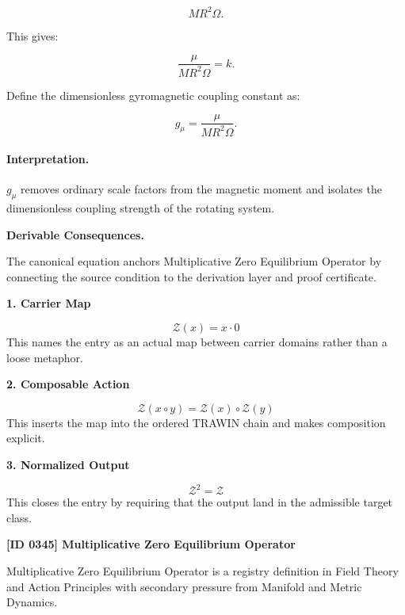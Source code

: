 \begin{equation}
MR^2\Omega .
\end{equation}

This gives:

\begin{equation}
\frac{\mu}{MR^2\Omega}=k .
\end{equation}

Define the dimensionless gyromagnetic coupling constant as:

\begin{equation}
\boxed{
g_{\mu}
=
\frac{\mu}
{MR^2\Omega}.
}
\end{equation}

\paragraph{Interpretation.}
$g_{\mu}$ removes ordinary scale factors from the magnetic moment and isolates the dimensionless coupling strength of the rotating system.

\par\vspace{0.35em}
\noindent\textbf{Derivable Consequences.}\quad
\begingroup
\footnotesize
\raggedright
The canonical equation anchors Multiplicative Zero Equilibrium Operator by connecting the source condition to the derivation layer and proof certificate.
\par\endgroup

\noindent\textbf{1. Carrier Map}\par
\[
\mathcal{Z}(x)=x\cdot0
\]
\noindent This names the entry as an actual map between carrier domains rather than a loose metaphor.\par
\noindent\textbf{2. Composable Action}\par
\[
\mathcal{Z}(x\circ y)=\mathcal{Z}(x)\circ\mathcal{Z}(y)
\]
\noindent This inserts the map into the ordered TRAWIN chain and makes composition explicit.\par
\noindent\textbf{3. Normalized Output}\par
\[
\mathcal{Z}^{2}=\mathcal{Z}
\]
\noindent This closes the entry by requiring that the output land in the admissible target class.\par

\clearpage
\noindent\textbf{[ID 0345] Multiplicative Zero Equilibrium Operator}\par
\vspace{0.35em}
\begingroup\small
{}
Multiplicative Zero Equilibrium Operator is a registry definition in Field Theory and Action Principles with secondary pressure from Manifold and Metric Dynamics.

